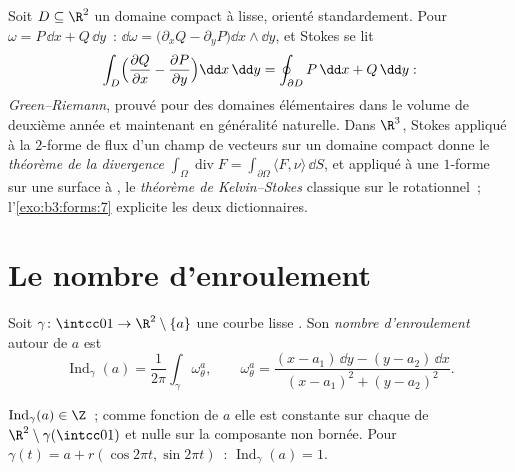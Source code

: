 \begin{example}
\label{ex:b3:forms:classical}
Soit $D \subseteq \R^2$ un domaine compact à  lisse,
orienté standardement. Pour $\omega = P\,\dd x + Q\,\dd y$~:
$\dd\omega = \bigl(\partial_xQ - \partial_yP\bigr)\dd
x\wedge\dd y$, et Stokes se lit
\[
\int_D\Bigl(\frac{\partial Q}{\partial x} -
\frac{\partial P}{\partial y}\Bigr)\dd x\,\dd y
= \oint_{\partial D}P\,\dd x + Q\,\dd y :
\]
\emph{Green--Riemann}, prouvé pour des domaines élémentaires
dans le volume de deuxième année et maintenant en généralité
naturelle. Dans $\R^3$, Stokes appliqué à la $2$-forme de
flux d'un champ de vecteurs sur un domaine compact donne le
\emph{théorème de la divergence}
$\int_\Omega\operatorname{div}F =
\int_{\partial\Omega}\langle F, \nu\rangle\,\dd S$, et
appliqué à une $1$-forme sur une surface à , le
\emph{théorème de Kelvin--Stokes} classique sur le
rotationnel~; l'\cref{exo:b3:forms:7} explicite les deux
dictionnaires.
\end{example}

\section{Le nombre d'enroulement}\label{sec:b3:forms:winding}

\begin{definition}\label{def:b3:forms:winding}
Soit $\gamma\colon\intcc01\to\R^2\setminus\{a\}$ une courbe
lisse . Son \emph{nombre
d'enroulement} autour de $a$ est
\[
\operatorname{Ind}_\gamma(a) =
\frac1{2\pi}\int_\gamma\omega_\theta^a,
\qquad
\omega_\theta^a = \frac{(x - a_1)\,\dd y - (y - a_2)\,\dd
x}{(x - a_1)^2 + (y - a_2)^2} .
\]
\end{definition}

\begin{proposition}\label{prop:b3:forms:windinginteger}
$\operatorname{Ind}_\gamma(a) \in \Z$~; comme fonction de
$a$ elle est constante sur chaque  de
$\R^2\setminus\gamma(\intcc01)$ et nulle sur la composante
non bornée. Pour $\gamma(t) = a + r(\cos2\pi t, \sin2\pi
t)$~: $\operatorname{Ind}_\gamma(a) = 1$.
\end{proposition}

